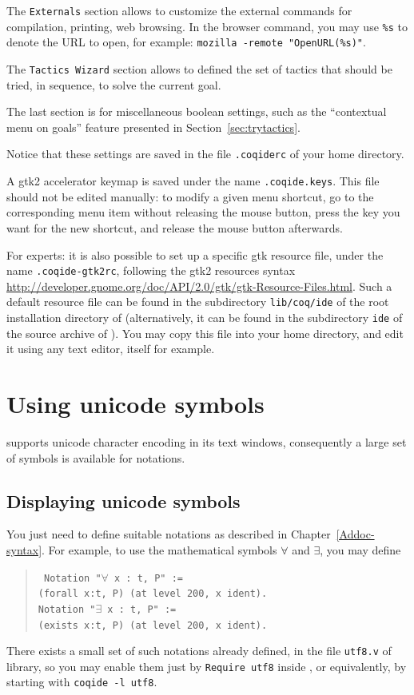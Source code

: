 The \verb|Externals| section allows to customize the external commands
for compilation, printing, web browsing. In the browser command, you
may use \verb|%s| to denote the URL to open, for example: %
\verb|mozilla -remote "OpenURL(%s)"|. 

The \verb|Tactics Wizard| section allows to defined the set of tactics
that should be tried, in sequence, to solve the current goal.

The last section is for miscellaneous boolean settings, such as the
``contextual menu on goals'' feature presented in
Section~\ref{sec:trytactics}. 

Notice that these settings are saved in the file \verb|.coqiderc| of
your home directory. 

A gtk2 accelerator keymap is saved under the name \verb|.coqide.keys|.
This file should not be edited manually: to modify a given menu
shortcut, go to the corresponding menu item without releasing the
mouse button, press the key you want for the new shortcut, and release
the mouse button afterwards.

For experts: it is also possible to set up a specific gtk resource
file, under the name \verb|.coqide-gtk2rc|, following the gtk2
resources syntax
\url{http://developer.gnome.org/doc/API/2.0/gtk/gtk-Resource-Files.html}.
Such a default resource file can be found in the subdirectory
\verb=lib/coq/ide= of the root installation directory of \Coq{}
(alternatively, it can be found in the subdirectory \verb=ide= of the
source archive of \Coq{}). You may
copy this file into your home directory, and edit it using any text
editor, \CoqIDE{} itself for example.

\section{Using unicode symbols}

\CoqIDE{} supports unicode character encoding in its text windows,
consequently a large set of symbols is available for notations.

\subsection{Displaying unicode symbols}

You just need to define suitable notations as described in
Chapter~\ref{Addoc-syntax}. For example, to use the mathematical symbols
$\forall$ and $\exists$, you may define 
\begin{quote}\tt
Notation "$\forall$ x : t, P" := \\
\qquad  (forall x:t, P) (at level 200, x ident).\\
Notation "$\exists$ x : t, P" := \\
\qquad  (exists x:t, P) (at level 200, x ident).
\end{quote}
There exists a small set of such notations already defined, in the
file \verb|utf8.v| of \Coq{} library, so you may enable them just by 
\verb|Require utf8| inside \CoqIDE{}, or equivalently, by starting
\CoqIDE{} with \verb|coqide -l utf8|.

